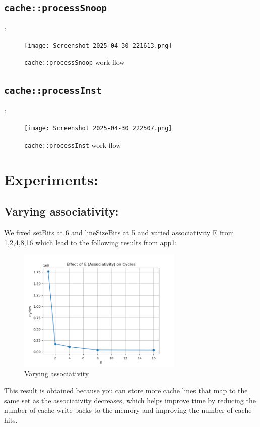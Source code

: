 \documentclass{article}
\begin{document}
\subsection{\texttt{cache::processSnoop}} :
\begin{figure}[h]
  \centering
  \texttt{[image: Screenshot 2025-04-30 221613.png]}
  \caption{\texttt{cache::processSnoop} work-flow}
  \label{fig:arch}
\end{figure}
\subsection{\texttt{cache::processInst}} :
\begin{figure}[h]
  \centering
  \texttt{[image: Screenshot 2025-04-30 222507.png]}
  \caption{\texttt{cache::processInst} work-flow}
  \label{fig:arch}
\end{figure}
\section{Experiments:}
\subsection{Varying associativity:}
We fixed setBits at 6 and lineSizeBits at 5 and varied associativity E from 1,2,4,8,16 which lead to the following results from app1:
\begin{figure}[h]
  \centering
  \includegraphics[width=0.7\textwidth]{plot_vary_E.png}
  \caption{Varying associativity}
  \label{fig:arch}
\end{figure}
This result is obtained because you can store more cache lines that map to the same set as the associativity decreases, which helps improve time by reducing the number of cache write backs to the memory and improving the number of cache hits.
\end{document}
